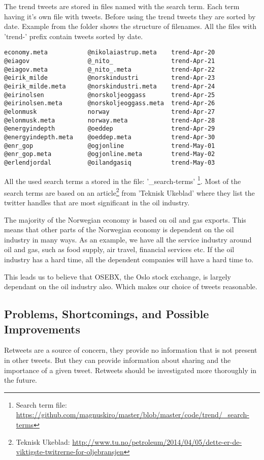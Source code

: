 The trend tweets are stored in files named with the search term. Each term
having it's own file with tweets. Before using the trend tweets they are sorted
by date. Example from the folder shows the structure of filenames. All the files
with 'trend-' prefix contain tweets sorted by date.   
\begin{verbatim}
economy.meta           @nikolaiastrup.meta    trend-Apr-20
@eiagov                @_nito_                trend-Apr-21
@eiagov.meta           @_nito_.meta           trend-Apr-22
@eirik_milde           @norskindustri         trend-Apr-23
@eirik_milde.meta      @norskindustri.meta    trend-Apr-24
@eirinolsen            @norskoljeoggass       trend-Apr-25
@eirinolsen.meta       @norskoljeoggass.meta  trend-Apr-26
@elonmusk              norway                 trend-Apr-27
@elonmusk.meta         norway.meta            trend-Apr-28
@energyindepth         @oeddep                trend-Apr-29
@energyindepth.meta    @oeddep.meta           trend-Apr-30
@enr_gop               @ogjonline             trend-May-01
@enr_gop.meta          @ogjonline.meta        trend-May-02
@erlendjordal          @oilandgasiq           trend-May-03
\end{verbatim}

All the used search terms a stored in the file: '\_search-terms'
\footnote{Search term file:
\url{https://github.com/magnuskiro/master/blob/master/code/trend/_search-terms}}.
Most of the search terms are based on an article\footnote{Teknisk Ukeblad:
\url{http://www.tu.no/petroleum/2014/04/05/dette-er-de-viktigste-twitrerne-for-oljebransjen}}
from 'Teknisk Ukeblad' where they list the twitter handles that are most
significant in the oil industry.

The majority of the Norwegian economy is based on oil and gas exports. This
means that other parts of the Norwegian economy is dependent on the oil
industry in many ways. As an example, we have all the service industry around
oil and gas, such as food supply, air travel, financial services etc. If the
oil industry has a hard time, all the dependent companies will have a hard time
to. 
 
This leads us to believe that OSEBX, the Oslo stock exchange, is largely
dependant on the oil industry also. Which makes our choice of tweets
reasonable. 
%

\subsection{Problems, Shortcomings, and Possible Improvements}
Retweets are a source of concern, they provide no information that is not
present in other tweets. But they can provide information about sharing and the importance of a given tweet. Retweets should be investigated more thoroughly in
the future.  

